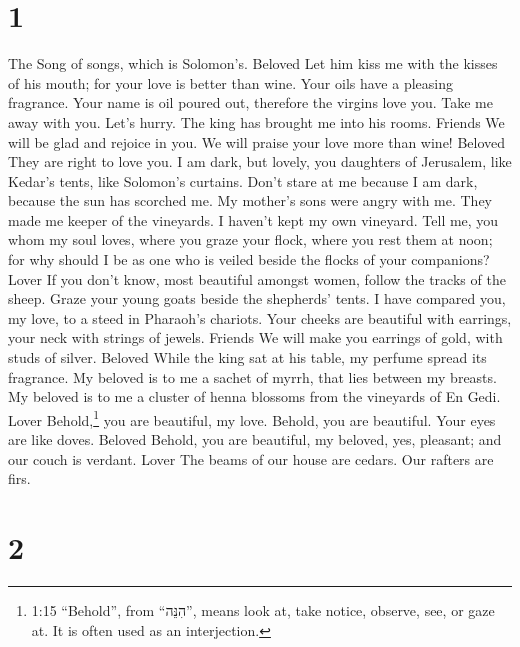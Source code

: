 \hypertarget{section}{%
\section{1}\label{section}}

 The Song of songs, which is Solomon's. Beloved 
Let him kiss me with the kisses of his mouth; for your love is better
than wine.  Your oils have a pleasing fragrance. Your name
is oil poured out, therefore the virgins love you.  Take me
away with you. Let's hurry. The king has brought me into his rooms.
Friends We will be glad and rejoice in you. We will praise your love
more than wine! Beloved They are right to love you.  I am
dark, but lovely, you daughters of Jerusalem, like Kedar's tents, like
Solomon's curtains.  Don't stare at me because I am dark,
because the sun has scorched me. My mother's sons were angry with me.
They made me keeper of the vineyards. I haven't kept my own vineyard.
 Tell me, you whom my soul loves, where you graze your
flock, where you rest them at noon; for why should I be as one who is
veiled beside the flocks of your companions? Lover  If you
don't know, most beautiful amongst women, follow the tracks of the
sheep. Graze your young goats beside the shepherds' tents. 
I have compared you, my love, to a steed in Pharaoh's chariots.
 Your cheeks are beautiful with earrings, your neck with
strings of jewels. Friends  We will make you earrings of
gold, with studs of silver. Beloved  While the king sat at
his table, my perfume spread its fragrance.  My beloved is
to me a sachet of myrrh, that lies between my breasts.  My
beloved is to me a cluster of henna blossoms from the vineyards of En
Gedi. Lover  Behold,\footnote{1:15 ``Behold'', from
  ``הִנֵּה'', means look at, take notice, observe, see, or gaze at. It
  is often used as an interjection.} you are beautiful, my love. Behold,
you are beautiful. Your eyes are like doves. Beloved 
Behold, you are beautiful, my beloved, yes, pleasant; and our couch is
verdant. Lover  The beams of our house are cedars. Our
rafters are firs.

\hypertarget{section-1}{%
\section{2}\label{section-1}}

